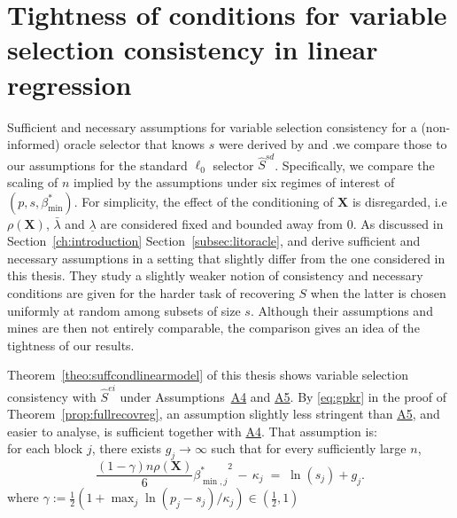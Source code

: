 \documentclass[
  12pt]{article}
\newcommand{\bX}{\mathbf{X}}
\begin{document}
\section{Tightness of conditions for variable selection consistency in linear regression}\label{suppsec:tightness}


Sufficient and necessary assumptions for variable selection consistency for a (non-informed) oracle selector that knows $s$ were derived by \cite{infotheowainwright} and \cite{wang2010}.we compare those to our assumptions for the standard $\ell_0$ selector $\hat{S}^{sd}$. Specifically, we compare the scaling of $n$ implied by the assumptions under six regimes of interest of $\left(p, s, \beta_{\min }^*\right)$. For simplicity, the effect of the conditioning of $\bX$ is disregarded, i.e $\rho(\bX)$, $\bar{\lambda}$ and $\underline{\lambda}$ are considered fixed and bounded away from 0. As discussed in Section~\ref{ch:introduction} Section~\ref{subsec:litoracle}, \cite{infotheowainwright} and \cite{wang2010} derive sufficient and necessary assumptions in a setting that slightly differ from the one considered in this thesis. They study a slightly weaker notion of consistency and necessary conditions are given for the harder task of recovering $S$ when the latter is chosen uniformly at random among subsets of size $s$. Although their assumptions and mines are then not entirely comparable, the comparison gives an idea of the tightness of our results.

Theorem~\ref{theo:suffcondlinearmodel} of this thesis shows variable selection consistency with $\hat{S}^{ei}$ under Assumptions~\hyperlink{lab:A4}{A4} and \hyperlink{lab:A5}{A5}. By \eqref{eq:gpkr} in the proof of Theorem~\ref{prop:fullrecovreg}, an assumption slightly less stringent than \hyperlink{lab:A5}{A5}, and easier to analyse, is sufficient together with \hyperlink{lab:A4}{A4}. That assumption is: \\[5pt]
for each block $j$, there exists $g_j\to \infty$ such that for every sufficiently large $n$,
    \begin{equation*}\label{eq:newasssufflinreg}
        \frac{(1-\gamma) n\rho(\bX)}{6}{\beta_{\min,j}^*}^2 \,- \,\kappa_j \;=\; \ln(s_j) + g_j.
    \end{equation*}
where $\gamma:=\tfrac12(1+\max_j\ln(p_j-s_j)/\kappa_j)\in (\tfrac12,1)$
\end{document}
